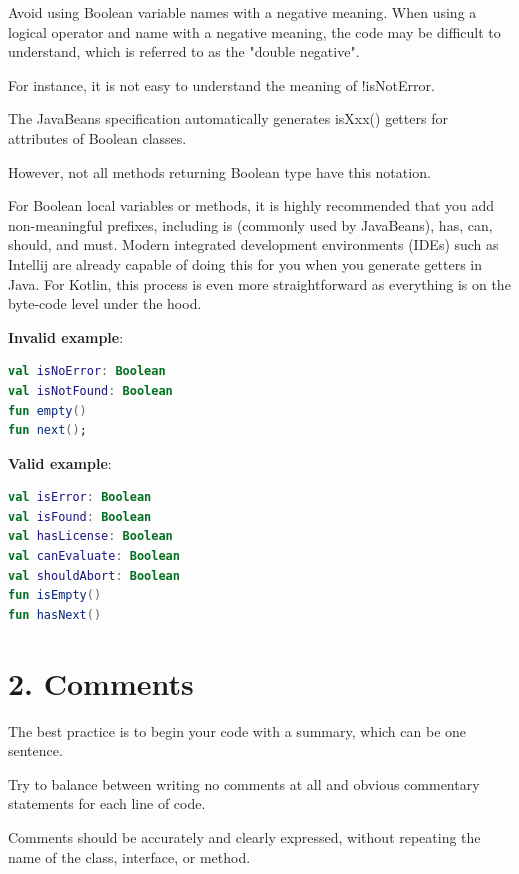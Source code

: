 {{{{{{{{{{{{{{{{\label{sec:1.6.2}



Avoid using Boolean variable names with a negative meaning. When using a logical operator and name with a negative meaning, the code may be difficult to understand, which is referred to as the "double negative".

For instance, it is not easy to understand the meaning of !isNotError.

The JavaBeans specification automatically generates isXxx() getters for attributes of Boolean classes.

However, not all methods returning Boolean type have this notation.

For Boolean local variables or methods, it is highly recommended that you add non-meaningful prefixes, including is (commonly used by JavaBeans), has, can, should, and must. Modern integrated development environments (IDEs) such as Intellij are already capable of doing this for you when you generate getters in Java. For Kotlin, this process is even more straightforward as everything is on the byte-code level under the hood.



\textbf{Invalid example}: 

\begin{lstlisting}[language=Kotlin]
val isNoError: Boolean
val isNotFound: Boolean
fun empty()
fun next();
\end{lstlisting}


\textbf{Valid example}:

\begin{lstlisting}[language=Kotlin]
val isError: Boolean
val isFound: Boolean
val hasLicense: Boolean
val canEvaluate: Boolean
val shouldAbort: Boolean
fun isEmpty()
fun hasNext()
\end{lstlisting}
\section*{\textbf{2. Comments}}

\label{sec:2.}



The best practice is to begin your code with a summary, which can be one sentence.

Try to balance between writing no comments at all and obvious commentary statements for each line of code.

Comments should be accurately and clearly expressed, without repeating the name of the class, interface, or method.

}}}}}}}}}}}}}}}}
